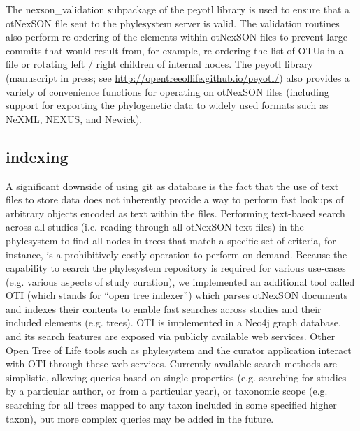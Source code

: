\documentclass{bioinfo}
\newcommand{\ps}{phylesystem\xspace}
\newcommand{\otol}{Open Tree of Life\xspace}
\newcommand{\nexson}{otNexSON\xspace}
\begin{document}
\begin{methods}
The nexson\_validation subpackage of the peyotl library is used to ensure that a \nexson file sent to the \ps
    server is valid. The validation routines also perform re-ordering of the elements within \nexson files to
    prevent large commits that would result from, for example, re-ordering the list of OTUs in a file or
    rotating left / right children of internal nodes. 
The peyotl library (manuscript in press; see \url{http://opentreeoflife.github.io/peyotl/}) also 
    provides a variety of convenience functions for operating on \nexson files (including support
    for exporting the phylogenetic data to widely used formats such as NeXML, NEXUS, and Newick).

\subsection*{indexing}
A significant downside of using git as database is the fact that the use of text files to store data does not inherently
    provide a way to perform fast lookups of arbitrary objects encoded as text within the files.
Performing text-based search across all studies (i.e. reading through all \nexson text files) in the \ps to find all nodes
    in trees that match a specific set of criteria, for instance, is a prohibitively costly operation to perform on demand.
Because the capability to search the \ps repository is required for various use-cases (e.g. various aspects of
    study curation), we implemented an additional tool called OTI (which stands for ``open tree indexer'') which parses \nexson
    documents and indexes their contents to enable fast searches across studies and their included elements (e.g. trees).
OTI is implemented in a Neo4j graph database, and its search features are exposed via publicly available web services.
Other \otol tools such as \ps and the curator application interact with OTI through these web services.
Currently available search methods are simplistic, allowing queries based on single properties (e.g. searching for studies
    by a particular author, or from a particular year), or taxonomic scope (e.g. searching for all trees mapped to
    any taxon included in some specified higher taxon), but more complex queries may be added in the future.



\end{methods}
\end{document}

